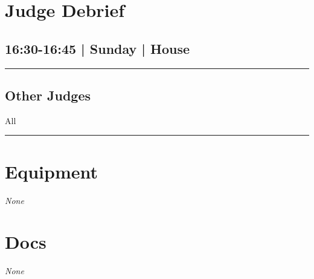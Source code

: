 \documentclass[10pt, A5]{article}
\begin{document}
        \begin{framed}
        \begin{minipage}{\textwidth}

        \setcounter{section}{92}
        \section{Judge Debrief}
        \subsection*{16:30-16:45 | Sunday | House}

        \vspace{0.25cm}
        \hrule
        \vspace{0.25cm}


        \subsection*{Other Judges}
                    All

            \vspace{0.25cm}
        \hrule
        \vspace{0.25cm}

        \begin{multicols}{2}

		\section*{\faWrench \: Equipment}

				\textit{None}
		
		\vfill\null
		\columnbreak

			\section*{\faFile \: Docs}
		 	\textit{None}
	

		\vfill\null

		\end{multicols}
\end{minipage}
\end{framed}
\end{document}
